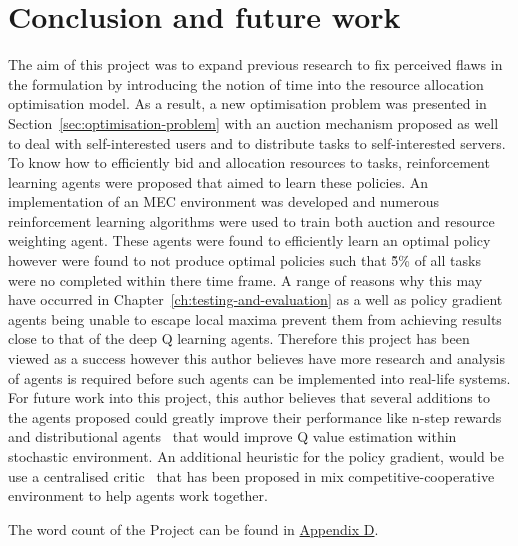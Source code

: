 \chapter{Conclusion and future work}
\label{ch:conclusion-and-future-work}
The aim of this project was to expand previous research to fix perceived flaws in the formulation by introducing the
notion of time into the resource allocation optimisation model. As a result, a new optimisation problem was presented
in Section~\ref{sec:optimisation-problem} with an auction mechanism proposed as well to deal with self-interested
users and to distribute tasks to self-interested servers. To know how to efficiently bid and allocation resources to
tasks, reinforcement learning agents were proposed that aimed to learn these policies. An implementation of an MEC
environment was developed and numerous reinforcement learning algorithms were used to train both auction and resource
weighting agent. These agents were found to efficiently learn an optimal policy however were found to not produce
optimal policies such that \~5\% of all tasks were no completed within there time frame. A range of reasons why this
may have occurred in Chapter~\ref{ch:testing-and-evaluation} as a well as policy gradient agents being unable to
escape local maxima prevent them from achieving results close to that of the deep Q learning agents. Therefore this
project has been viewed as a success however this author believes have more research and analysis of agents is required
before such agents can be implemented into real-life systems. \\
For future work into this project, this author believes that several additions to the agents proposed could greatly
improve their performance like n-step rewards~\citep{multi-step-dqn} and distributional agents~\citep{distributional_dqn}
that would improve Q value estimation within stochastic environment. An additional heuristic for the policy gradient,
would be use a centralised critic~\citep{maddpg} that has been proposed in mix competitive-cooperative environment to
help agents work together.

The word count of the Project can be found in \hyperref[app:project-management]{Appendix D}.
